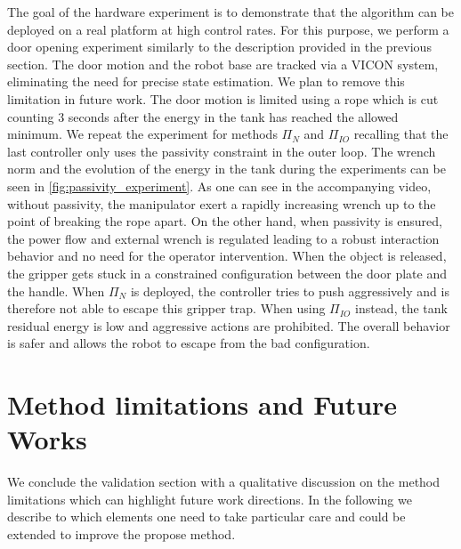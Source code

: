 The goal of the hardware experiment is to demonstrate that the algorithm can be deployed on a real platform at high control rates. For this purpose, we perform a door opening experiment similarly to the description provided in the previous section. The door motion and the robot base are tracked via a VICON system, eliminating the need for precise state estimation. We plan to remove this limitation in future work. The door motion is limited using a rope which is cut counting 3 seconds after the energy in the tank has reached the allowed minimum. We repeat the experiment for methods $\Pi_{N}$ and $\Pi_{IO}$ recalling that the last controller only uses the passivity constraint in the outer loop. The wrench norm and the evolution of the energy in the tank during the experiments can be seen in \fig \ref{fig:passivity_experiment}. As one can see in the accompanying video, without passivity, the manipulator exert a rapidly increasing wrench up to the point of breaking the rope apart. On the other hand, when passivity is ensured, the power flow and external wrench is regulated leading to a robust interaction behavior and no need for the operator intervention. When the object is released, the gripper gets stuck in a constrained configuration between the door plate and the handle. When $\Pi_{N}$ is deployed, the controller tries to push aggressively and is therefore not able to escape this gripper trap. When using $\Pi_{IO}$ instead, the tank residual energy is low and aggressive actions are prohibited. The overall behavior is safer and allows the robot to escape from the bad configuration.  


\section{Method limitations and Future Works}
We conclude the validation section with a qualitative discussion on the method limitations which can highlight future work directions. In the following we describe to which elements one need to take particular care and could be extended to improve the propose method.

